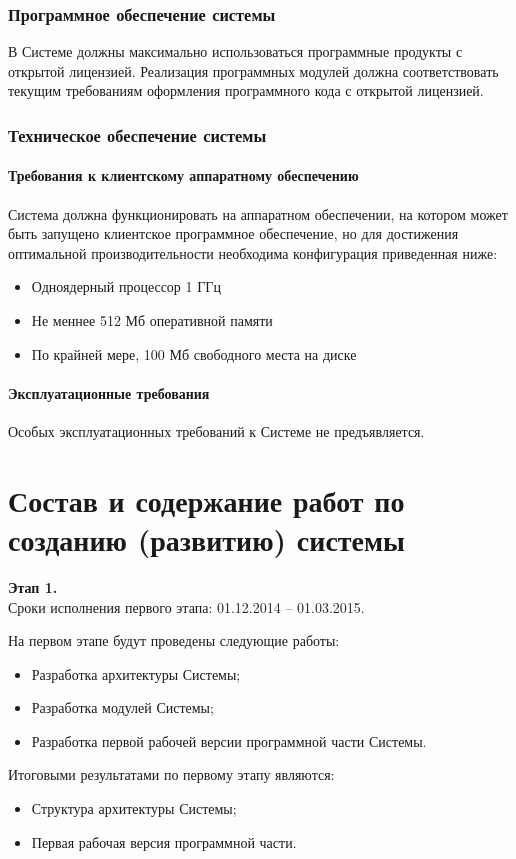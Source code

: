 \subsection{Программное обеспечение системы}
В Системе должны максимально использоваться программные продукты с открытой
лицензией. Реализация программных модулей должна соответствовать текущим
требованиям оформления программного кода с открытой лицензией.

\subsection{Техническое обеспечение системы}
\subsubsection{Требования к клиентскому аппаратному обеспечению}
Система должна функционировать на аппаратном обеспечении, на котором может быть
запущено клиентское программное обеспечение, но для достижения оптимальной
производительности необходима конфигурация приведенная ниже:
\begin{itemize}
  \item Одноядерный процессор 1 ГГц
  \item Не меннее 512 Мб оперативной памяти
  \item По крайней мере, 100 Мб свободного места на диске
\end{itemize}

\subsubsection{Эксплуатационные требования}
Особых эксплуатационных требований к Системе не предъявляется.

\chapter{Состав и содержание работ по созданию (развитию) системы}
\textbf{Этап 1.}\\
Сроки исполнения первого этапа: 01.12.2014 -- 01.03.2015.

На первом этапе будут проведены следующие работы:
\begin{itemize}
  \item Разработка архитектуры Системы;
  \item Разработка модулей Системы;
  \item Разработка первой рабочей версии программной части Системы.
\end{itemize}
Итоговыми результатами по первому этапу являются:
\begin{itemize}
  \item Структура архитектуры Системы;
  \item Первая рабочая версия программной части.
\end{itemize}

